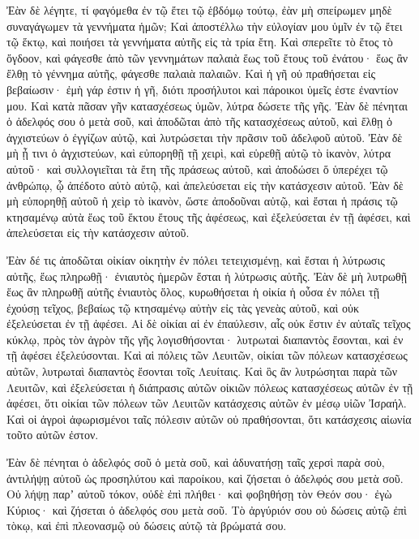 {Ἐὰν δὲ λέγητε, τί φαγόμεθα ἐν τῷ ἔτει τῷ ἑβδόμῳ τούτῳ, ἐὰν μὴ σπείρωμεν μηδὲ συναγάγωμεν τὰ γεννήματα ἡμῶν;
Καὶ ἀποστέλλω τὴν εὐλογίαν μου ὑμῖν ἐν τῷ ἔτει τῷ ἕκτῳ, καὶ ποιήσει τὰ γεννήματα αὐτῆς εἰς τὰ τρία ἔτη.
Καὶ σπερεῖτε τὸ ἔτος τὸ ὄγδοον, καὶ φάγεσθε ἀπὸ τῶν γεννημάτων παλαιὰ ἕως τοῦ ἔτους τοῦ ἐνάτου· ἕως ἂν ἔλθῃ τὸ γέννημα αὐτῆς, φάγεσθε παλαιὰ παλαιῶν.
Καὶ ἡ γῆ οὐ πραθήσεται εἰς βεβαίωσιν· ἐμὴ γάρ ἐστιν ἡ γῆ, διότι προσήλυτοι καὶ πάροικοι ὑμεῖς ἐστε ἐναντίον μου.
Καὶ κατὰ πᾶσαν γῆν κατασχέσεως ὑμῶν, λύτρα δώσετε τῆς γῆς.
Ἐὰν δὲ πένηται ὁ ἀδελφός σου ὁ μετὰ σοῦ, καὶ ἀποδῶται ἀπὸ τῆς κατασχέσεως αὐτοῦ, καὶ ἔλθῃ ὁ ἀγχιστεύων ὁ ἐγγίζων αὐτῷ, καὶ λυτρώσεται τὴν πρᾶσιν τοῦ ἀδελφοῦ αὐτοῦ.
Ἐὰν δὲ μὴ ᾖ τινι ὁ ἀγχιστεύων, καὶ εὐπορηθῇ τῇ χειρὶ, καὶ εὑρεθῇ αὐτῷ τὸ ἱκανὸν, λύτρα αὐτοῦ·
καὶ συλλογιεῖται τὰ ἔτη τῆς πράσεως αὐτοῦ, καὶ ἀποδώσει ὅ ὑπερέχει τῷ ἀνθρώπῳ, ᾧ ἀπέδοτο αὐτὸ αὐτῷ, καὶ ἀπελεύσεται εἰς τὴν κατάσχεσιν αὐτοῦ.
Ἐὰν δὲ μὴ εὑπορηθῇ αὐτοῦ ἡ χεὶρ τὸ ἱκανὸν, ὥστε ἀποδοῦναι αὐτῷ, καὶ ἔσται ἡ πράσις τῷ κτησαμένῳ αὐτὰ ἕως τοῦ ἕκτου ἔτους τῆς ἀφέσεως, καὶ ἐξελεύσεται ἐν τῇ ἀφέσει, καὶ ἀπελεύσεται εἰς τὴν κατάσχεσιν αὐτοῦ.
\par }{\PP {}Ἐὰν δέ τις ἀποδῶται οἰκίαν οἰκητὴν ἐν πόλει τετειχισμένῃ, καὶ ἔσται ἡ λύτρωσις αὐτῆς, ἕως πληρωθῇ· ἐνιαυτὸς ἡμερῶν ἔσται ἡ λύτρωσις αὐτῆς.
Ἐὰν δὲ μὴ λυτρωθῇ ἕως ἂν πληρωθῇ αὐτῆς ἐνιαυτὸς ὅλος, κυρωθήσεται ἡ οἰκία ἡ οὖσα ἐν πόλει τῇ ἐχούσῃ τεῖχος, βεβαίως τῷ κτησαμένῳ αὐτὴν εἰς τὰς γενεὰς αὐτοῦ, καὶ οὐκ ἐξελεύσεται ἐν τῇ ἀφέσει.
Αἱ δὲ οἰκίαι αἱ ἐν ἐπαύλεσιν, αἷς οὐκ ἔστιν ἐν αὐταῖς τεῖχος κύκλῳ, πρὸς τὸν ἀγρὸν τῆς γῆς λογισθήσονται· λυτρωταὶ διαπαντὸς ἔσονται, καὶ ἐν τῇ ἀφέσει ἐξελεύσονται.
Καὶ αἱ πόλεις τῶν Λευιτῶν, οἰκίαι τῶν πόλεων κατασχέσεως αὐτῶν, λυτρωταὶ διαπαντὸς ἔσονται τοῖς Λευίταις.
Καὶ ὃς ἂν λυτρώσηται παρὰ τῶν Λευιτῶν, καὶ ἐξελεύσεται ἡ διάπρασις αὐτῶν οἰκιῶν πόλεως κατασχέσεως αὐτῶν ἐν τῇ ἀφέσει, ὅτι οἰκίαι τῶν πόλεων τῶν Λευιτῶν κατάσχεσις αὐτῶν ἐν μέσῳ υἱῶν Ἰσραήλ.
Καὶ οἱ ἀγροὶ ἀφωρισμένοι ταῖς πόλεσιν αὐτῶν οὐ πραθήσονται, ὅτι κατάσχεσις αἰωνία τοῦτο αὐτῶν ἐστον.
\par }{\PP {}Ἐὰν δὲ πένηται ὁ ἀδελφός σοῦ ὁ μετὰ σοῦ, καὶ ἀδυνατήσῃ ταῖς χερσὶ παρὰ σοὺ, ἀντιλήψῃ αὐτοῦ ὡς προσηλύτου καὶ παροίκου, καὶ ζήσεται ὁ ἀδελφός σου μετὰ σοῦ.
Οὐ λήψῃ παρʼ αὐτοῦ τόκον, οὐδὲ ἐπὶ πλήθει· καὶ φοβηθήσῃ τὸν Θεόν σου· ἐγὼ Κύριος· καὶ ζήσεται ὁ ἀδελφός σου μετὰ σοῦ.
Τὸ ἀργύριόν σου οὐ δώσεις αὐτῷ ἐπὶ τὸκῳ, καὶ ἐπὶ πλεονασμῷ οὐ δώσεις αὐτῷ τὰ βρώματά σου.
}
